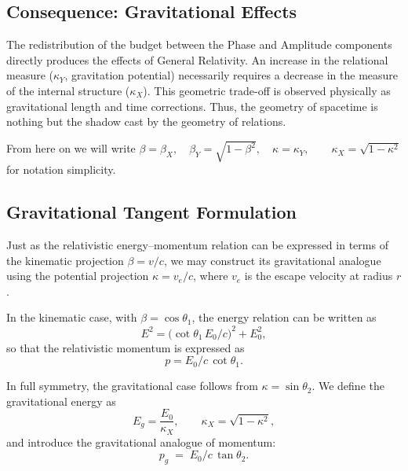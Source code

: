 \documentclass[12pt, a4paper]{article}
\begin{document}
\subsection{Consequence: Gravitational Effects}

The redistribution of the budget between the Phase and Amplitude components directly produces the effects of General Relativity. An increase in the relational measure ($\kappa_Y$, gravitation potential) necessarily requires a decrease in the measure of the internal structure ($\kappa_X$). This geometric trade-off is observed physically as gravitational length and time corrections. Thus, the geometry of spacetime is nothing but the shadow cast by the geometry of relations.


\begin{tcolorbox}[colback=gray!5, colframe=black!80!black, title=Notation simplicity:]
From here on we will write  \(\beta=\beta_X , \quad \beta_Y=\sqrt{1-\beta^{2}},\quad  \kappa=\kappa_Y , \qquad \kappa_{X} = \sqrt{1 - \kappa^{2}}\) for notation simplicity.
\end{tcolorbox}

\subsection{Gravitational Tangent Formulation}

Just as the relativistic energy--momentum relation can be expressed in terms of the kinematic projection 
$\beta = v/c$, we may construct its gravitational analogue using the potential projection $\kappa = v_{e}/c$, where $v_{e}$ is the escape velocity at radius $r$. 

In the kinematic case, with $\beta = \cos\theta_{1}$, the energy relation can be written as
\begin{equation}
    E^{2} = \bigl(\cot\theta_{1}\,E_{0}/c\bigr)^{2} + E_{0}^{2},
\end{equation}
so that the relativistic momentum is expressed as
\begin{equation}
    p = E_{0}/c\,\cot\theta_{1}.
\end{equation}

In full symmetry, the gravitational case follows from $\kappa = \sin\theta_{2}$. 
We define the gravitational energy as
\begin{equation}
    E_{g} = \frac{E_{0}}{\kappa_{X}}, 
    \qquad \kappa_{X} = \sqrt{1 - \kappa^{2}},
\end{equation}
and introduce the gravitational analogue of momentum:
\begin{equation}
    p_g \;=\; E_{0}/c\,\tan\theta_{2}.
\end{equation}
\end{document}
